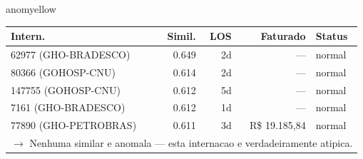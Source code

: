 \documentclass[a4paper,10pt]{article}
\begin{document}
\begin{anomalycard}[Internacao 100080 | GHO-PETROBRAS | MODERADO (z=2.16)]{anomyellow}
\begin{tabular}{l r r r l}\toprule\textbf{Intern.} & \textbf{Simil.} & \textbf{LOS} & \textbf{Faturado} & \textbf{Status} \\\midrule
62977 (GHO-BRADESCO) & 0.649 & 2d & --- & \textcolor{jcubeblue}{normal} \\
80366 (GOHOSP-CNU) & 0.614 & 2d & --- & \textcolor{jcubeblue}{normal} \\
147755 (GOHOSP-CNU) & 0.612 & 5d & --- & \textcolor{jcubeblue}{normal} \\
7161 (GHO-BRADESCO) & 0.612 & 1d & --- & \textcolor{jcubeblue}{normal} \\
77890 (GHO-PETROBRAS) & 0.611 & 3d & R\$ 19.185,84 & \textcolor{jcubeblue}{normal} \\
\multicolumn{5}{l}{\textcolor{jcubeblue}{\small $\rightarrow$ Nenhuma similar e anomala --- esta internacao e verdadeiramente atipica.}} \\
\bottomrule\end{tabular}


\end{anomalycard}

\newpage
\end{document}
